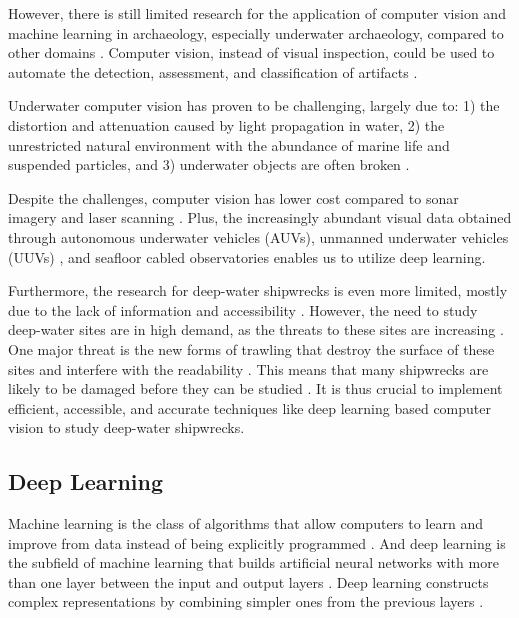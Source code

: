 \documentclass[a4paper, 11pt, oneside]{article}
\begin{document}
  However, there is still limited research for the application of computer vision and machine learning in archaeology,
  especially underwater archaeology, compared to other domains \cite{maaten2007computer, qin2015underwater}.
  Computer vision, instead of visual inspection, could be used to automate the detection, assessment, and classification
  of artifacts \cite{maaten2007computer}.

  Underwater computer vision has proven to be challenging, largely due to: 1) the distortion and attenuation caused by
  light propagation in water, 2) the unrestricted natural environment with the abundance of marine life and suspended
  particles, and 3) underwater objects are often broken
  \cite{qin2015underwater, rizzini2015investigation, lu2017underwater, mccarthy20193d}.

  Despite the challenges, computer vision has lower cost \cite{rizzini2015investigation} compared to sonar imagery
  \cite{abu2019statistically} and laser scanning \cite{gordon1992use}. Plus, the increasingly abundant visual data obtained
  through autonomous underwater vehicles (AUVs), unmanned underwater vehicles (UUVs)
  \cite{lu2017underwater, moniruzzaman2017deep}, and seafloor cabled observatories \cite{qin2015underwater} enables us
  to utilize deep learning.

  Furthermore, the research for deep-water shipwrecks is even more limited, mostly due to the lack of information and
  accessibility \cite{drap2015underwater}. However, the need to study deep-water sites are in high demand, as the threats
  to these sites are increasing \cite{drap2015underwater}. One major threat is the new forms of trawling that destroy the
  surface of these sites and interfere with the readability \cite{drap2015underwater}. This means that many
  shipwrecks are likely to be damaged before they can be studied \cite{drap2015underwater}. It is thus crucial to implement
  efficient, accessible, and accurate techniques like deep learning based computer vision to study deep-water shipwrecks.

  \subsection{Deep Learning}

  Machine learning is the class of algorithms that allow computers to learn and improve from data instead of being
  explicitly programmed \cite{samuel1959some, geron2019hands}. And deep learning is the subfield of machine learning that
  builds artificial neural networks with more than one layer between the input and output layers
  \cite{geron2019hands, burkov2019hundred, zhang2018definition}. Deep learning constructs complex representations by
  combining simpler ones from the previous layers \cite{goodfellow2016deep}.
\end{document}
